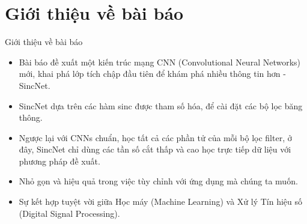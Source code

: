 \documentclass[notheorems, aspectratio=54]{beamer}
\begin{document}
\section{Giới thiệu về bài báo}
\begin{frame}{Giới thiệu về bài báo}
	\begin{itemize}
		\item Bài báo đề xuất một kiến trúc mạng CNN (Convolutional Neural Networks) mới, khai phá lớp tích chập đầu tiên để khám phá nhiều thông tin hơn - SincNet.
		\item SincNet dựa trên các hàm sinc được tham số hóa, để cài đặt các bộ lọc băng thông.
		\item Ngược lại với CNNs chuẩn, học tất cả các phần tử của mỗi bộ lọc filter, ở đây, SincNet chỉ dùng các tần số cắt thấp và cao học trực tiếp dữ liệu với phương pháp đề xuất.
		\item Nhỏ gọn và hiệu quả trong việc tùy chỉnh với ứng dụng mà chúng ta muốn.
		\item Sự kết hợp tuyệt vời giữa Học máy (Machine Learning) và Xử lý Tín hiệu số (Digital
		Signal Processing).
	\end{itemize}
\end{frame}
\end{document}
